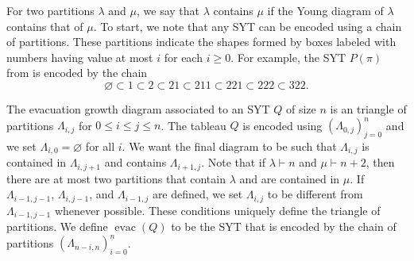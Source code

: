 \documentclass[12pt]{article}
\newcommand{\evac}{\operatorname{evac}}
\theoremstyle{definition}
\begin{document}
For two partitions $\lambda$ and $\mu$, we say that $\lambda$ contains $\mu$ if the Young diagram of $\lambda$ contains that of $\mu$. 
To start, we note that any SYT can be encoded using a chain of partitions. 
These partitions indicate the shapes formed by boxes labeled with numbers having value at most $i$ for each $i \geq 0$. 
For example, the SYT $P(\pi)$ from  is encoded by the chain
\begin{equation*}
    \varnothing \subset 1 \subset 2 \subset 21 \subset 211 \subset 221 \subset 222 \subset 322.
\end{equation*}

The evacuation growth diagram associated to an SYT $Q$ of size $n$ is an triangle of partitions $\Lambda_{i, j}$ for $0 \leq i \leq j \leq n$. 
The tableau $Q$ is encoded using $(\Lambda_{0, j})_{j = 0}^n$ and we set $\Lambda_{i, 0} = \varnothing$ for all $i$. 
We want the final diagram to be such that $\Lambda_{i, j}$ is contained in $\Lambda_{i, j + 1}$ and contains $\Lambda_{i + 1, j}$. 
Note that if $\lambda \vdash n$ and $\mu \vdash n + 2$, then there are at most two partitions that contain $\lambda$ and are contained in $\mu$. 
If $\Lambda_{i - 1, j - 1}$, $\Lambda_{i, j - 1}$, and $\Lambda_{i - 1, j}$ are defined, we set $\Lambda_{i, j}$ to be different from $\Lambda_{i - 1, j - 1}$ whenever possible. 
These conditions uniquely define the triangle of partitions. 
We define $\evac(Q)$ to be the SYT that is encoded by the chain of partitions $(\Lambda_{n - i, n})_{i = 0}^n$.
\end{document}
